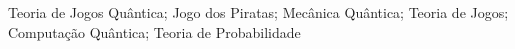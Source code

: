 \begin{palavraschave}
Teoria de Jogos Qu\^antica; Jogo dos Piratas; Mec\^anica Qu\^antica; Teoria de Jogos; Computa\c{c}\~{a}o Qu\^{a}ntica; Teoria de Probabilidade
\end{palavraschave}
\clearpage
\thispagestyle{empty}
\cleardoublepage